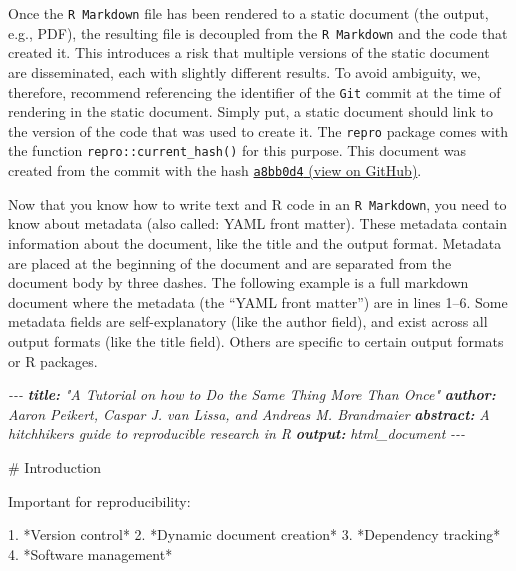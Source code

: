 \documentclass[psych,tutorial,accept,moreauthors,pdftex]{Definitions/mdpi}
\newenvironment{Shaded}{\begin{snugshade}}{\end{snugshade}}
\newcommand{\AnnotationTok}[1]{\textcolor[rgb]{0.56,0.35,0.01}{\textbf{\textit{#1}}}}
\newcommand{\CommentTok}[1]{\textcolor[rgb]{0.56,0.35,0.01}{\textit{#1}}}
\newcommand{\FunctionTok}[1]{\textcolor[rgb]{0.00,0.00,0.00}{#1}}
\newcommand{\NormalTok}[1]{#1}
\newcommand{\SpecialStringTok}[1]{\textcolor[rgb]{0.31,0.60,0.02}{#1}}
\begin{document}
\begin{paracol}{2}
Once the \texttt{R\ Markdown} file has been rendered to a static
document (the output, e.g., PDF), the resulting file is decoupled from
the \texttt{R\ Markdown} and the code that created it. This introduces a
risk that multiple versions of the static document are disseminated,
each with slightly different results. To avoid ambiguity, we, therefore,
recommend referencing the identifier of the \texttt{Git} commit at the
time of rendering in the static document. Simply put, a static document
should link to the version of the code that was used to create it. The
\texttt{repro} package comes with the function
\texttt{repro::current\_hash()} for this purpose. This document was
created from the commit with the hash
\href{https://github.com/aaronpeikert/repro-tutorial/tree/a8bb0d4df4afa4f7dbb5cd2344ae16043cb8a99d}{\texttt{a8bb0d4}
(view on GitHub)}.

Now that you know how to write text and R code in an
\texttt{R\ Markdown}, you need to know about metadata (also called: YAML
front matter). These metadata contain information about the document,
like the title and the output format. Metadata are placed at the
beginning of the document and are separated from the document body by
three dashes. The following example is a full markdown document where
the metadata (the ``YAML front matter'') are in lines 1--6. Some
metadata fields are self-explanatory (like the author field), and exist
across all output formats (like the title field). Others are specific to
certain output formats or R packages.

\begin{adjustwidth}{0.5cm}{0cm} 
\begin{Shaded}
\begin{Highlighting}[]
\CommentTok{{-}{-}{-}}
\AnnotationTok{title:}\CommentTok{ "A Tutorial on how to Do the Same Thing More Than Once"}
\AnnotationTok{author:}\CommentTok{ Aaron Peikert, Caspar J. van Lissa, and Andreas M. Brandmaier}
\AnnotationTok{abstract:}\CommentTok{ A hitchhiker\textquotesingle{}s guide to reproducible research in R}
\AnnotationTok{output:}\CommentTok{ html\_document}
\CommentTok{{-}{-}{-}}

\FunctionTok{\# Introduction}

\NormalTok{Important for reproducibility:}

\SpecialStringTok{1. }\NormalTok{*Version control*}
\SpecialStringTok{2. }\NormalTok{*Dynamic document creation*}
\SpecialStringTok{3. }\NormalTok{*Dependency tracking*}
\SpecialStringTok{4. }\NormalTok{*Software management*}


\end{Highlighting}
\end{Shaded}
\end{adjustwidth}
\end{paracol}
\end{document}
